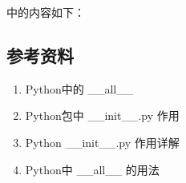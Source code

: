 \documentclass[letterpaper,10pt,english]{sphinxmanual}
\begin{document}
 中的内容如下：

%
\begin{sphinxVerbatim}[commandchars=\\\{\},numbers=left,firstnumber=1,stepnumber=1]
   

 

\end{sphinxVerbatim}


\subsection{参考资料}
\label{\detokenize{python/02_all:id1}}\begin{enumerate}
\item {} 
Python中的 \_\_all\_\_

\end{enumerate}
\begin{quote}

\end{quote}
\begin{enumerate}
\setcounter{enumi}{1}
\item {} 
Python包中 \_\_init\_\_.py 作用

\end{enumerate}
\begin{quote}

\end{quote}
\begin{enumerate}
\setcounter{enumi}{2}
\item {} 
Python \_\_init\_\_.py 作用详解

\end{enumerate}
\begin{quote}

\end{quote}
\begin{enumerate}
\setcounter{enumi}{3}
\item {} 
Python中 \_\_all\_\_ 的用法

\end{enumerate}
\begin{quote}

\end{quote}
\end{document}
